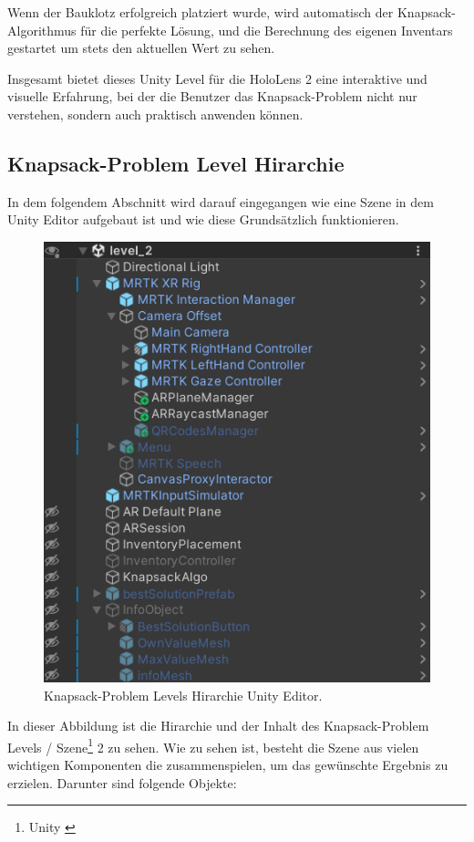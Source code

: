 Wenn der Bauklotz erfolgreich platziert wurde, wird automatisch der Knapsack-Algorithmus für die perfekte Lösung,
und die Berechnung des eigenen Inventars gestartet um stets den aktuellen Wert zu sehen.

Insgesamt bietet dieses Unity Level für die HoloLens 2 eine interaktive und visuelle Erfahrung,
bei der die Benutzer das Knapsack-Problem nicht nur verstehen, sondern auch praktisch anwenden können.

\subsection{Knapsack-Problem Level Hirarchie}
In dem folgendem Abschnitt wird darauf eingegangen wie eine Szene in dem Unity Editor aufgebaut ist und wie diese Grundsätzlich
funktionieren.\\

\begin{figure}[h]
    \centering
    \includegraphics[scale=0.8]{images/Level2Hirarchy}
    \caption{Knapsack-Problem Levels Hirarchie Unity Editor.}
    \label{fig:level2_hierarchy}
\end{figure}

In dieser Abbildung ist die Hirarchie und der Inhalt des Knapsack-Problem Levels / Szene\footnote{Unity \cite{Scene}} 2 zu sehen.
Wie zu sehen ist, besteht die Szene aus vielen wichtigen Komponenten die zusammenspielen, um das gewünschte Ergebnis
zu erzielen. Darunter sind folgende Objekte:

